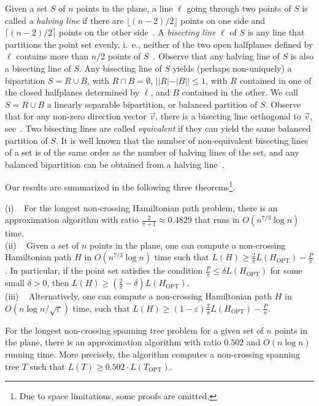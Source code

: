 \documentclass[proceedings]{stacs}
\def\eps{\varepsilon}
\begin{document}
Given a set $S$ of $n$ points in the plane,
a line $\ell$ going through two points of $S$ is called a
{\em halving line} if there are $\lfloor (n-2)/2 \rfloor$ points on one side and
$\lceil (n-2)/2 \rceil$ points on the other side~\cite{L71}.
A {\em bisecting line} $\ell$ of $S$ is any line that partitions the point
set evenly, i.~e., neither of the two open halfplanes defined by
$\ell$ contains more than $n/2$ points of $S$~\cite{E87}.
Observe that any halving line of $S$ is also a bisecting line of $S$.
Any bisecting line of $S$ yields (perhaps non-uniquely) a bipartition
$S=R \cup B$, with $R \cap B =\emptyset$, $||R|-|B|| \leq 1$,
with $R$ contained in one of the closed halfplanes determined by
$\ell$, and $B$ contained in the other.
We call $S=R \cup B$ a linearly separable bipartition, or balanced
partition of $S$. Observe that for any non-zero direction vector
$\vec{v}$, there is a bisecting line orthogonal to $\vec{v}$,
see~\cite[Lemma~4.4]{E87}. Two bisecting lines are called {\em equivalent}
if they can yield the same balanced partition of $S$.
It is well known that the number of non-equivalent bisecting lines
of a set is of the same order as the number of halving lines of the set,
and any balanced bipartition can be obtained from a halving
line~\cite[pp. 67]{E87}.

Our results are summarized in the following three
theorems\footnote{Due to space limitations, some proofs are omitted.}.


\begin{theorem} \label{T1}
{\rm (i) \ } For the longest non-crossing Hamiltonian path problem,
there is an approximation algorithm with ratio $\frac{2}{\pi+1} \approx 0.4829$
that runs in $O(n^{7/3}\log{n})$ time.\\
{\rm (ii) \ }
Given a set of $n$ points in the plane, one can
compute a  non-crossing Hamiltonian path $H$ in $O(n^{7/3}\log{n})$
time such that $L(H) \geq \frac{2}{\pi}L(H_\textrm{OPT})-\frac{P}{\pi}$.
In particular, if the point set satisfies the condition
$\frac{P}{\pi} \leq \delta L(H_\textrm{OPT})$ for some small $\delta>0$,
then $L(H) \geq (\frac{2}{\pi}-\delta)L(H_\textrm{OPT})$.\\
{\rm (iii) \ } Alternatively, one can compute a  non-crossing Hamiltonian path
$H$ in $O(n \log{n}/\sqrt{\eps})$ time,
such that $L(H) \geq (1-\eps)\frac{2}{\pi}L(H_\textrm{OPT})-\frac{P}{\pi}$.
\end{theorem}

\begin{theorem} \label{T2}
For the longest non-crossing spanning tree problem for
a given set of $n$ points in the plane, there is an
approximation algorithm with ratio $0.502$ and $O(n \log{n})$  running
time. More precisely, the algorithm computes a non-crossing spanning
tree $T$ such that $L(T) \geq 0.502 \cdot L(T_\textrm{OPT})$.
\end{theorem}
\end{document}

